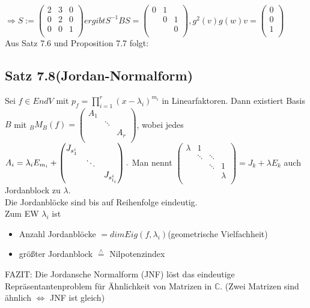 \documentclass[a4paper, 12pt]{extarticle}
\begin{document}
$\Rightarrow S := \left(\begin{matrix}
	2 & 3 & 0\\
	0 & 2 & 0\\
	0 & 0 & 1\\
\end{matrix}\right) ergibt S^{-1}BS = \left(\begin{matrix}
0 & 1 \\
& 0 & 1\\
& & 0\\
\end{matrix}\right), g^2(v) g(w) v = \left(\begin{matrix}
0\\
0\\
1\\
\end{matrix}\right)$\\
Aus Satz 7.6 und Proposition 7.7 folgt:
\subsection*{Satz 7.8(Jordan-Normalform)}
Sei $f\in EndV$ mit $p_f = \prod_{i = 1}^{r}(x-\lambda_i)^{m_i}$ in Linearfaktoren. Dann existiert Basis $B$ mit ${}_BM_B(f) = \left(\begin{matrix}
	A_1 \\
	& \ddots \\
	& & A_r\\
\end{matrix}\right)$, wobei jedes $A_i = \lambda_i E_{m_i} + \left(\begin{matrix}
J_{s_1^i} \\
& \ddots \\
& & J_{s_{l_i}^i}
\end{matrix}\right).\\$
Man nennt $\left(\begin{matrix}
\lambda & 1 \\
& \ddots & \ddots \\
& & \ddots & 1\\
& & &  \lambda \\
\end{matrix}\right) = J_k + \lambda E_k$ auch Jordanblock zu $\lambda$.\\
Die Jordanblöcke sind bis auf Reihenfolge eindeutig.\\
Zum EW $\lambda_i$ ist \begin{itemize}
	\item Anzahl Jordanblöcke $= dimEig(f,\lambda_i)$(geometrische Vielfachheit)
	\item größter Jordanblock $\stackrel{\wedge}{=}$ Nilpotenzindex
\end{itemize}
FAZIT: Die Jordansche Normalform (JNF) löst das eindeutige Repräsentantenproblem für Ähnlichkeit von Matrizen in $\mathbb{C}$. (Zwei Matrizen sind ähnlich $\Leftrightarrow$ JNF ist gleich)
\end{document}
